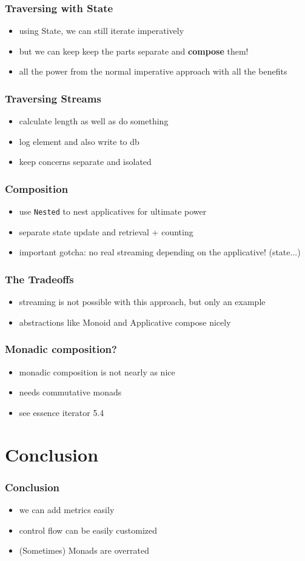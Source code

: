 \documentclass{beamer}
\begin{document}
\begin{frame}
  \frametitle{Traversing with State}
  \begin{itemize}
  \item using State, we can still iterate imperatively
  \item but we can keep keep the parts separate and \textbf{compose} them!
  \item all the power from the normal imperative approach with all the benefits
  \end{itemize}
\end{frame}

\begin{frame}
  \frametitle{Traversing Streams}
  \begin{itemize}
  \item calculate length as well as do something
  \item log element and also write to db
  \item keep concerns separate and isolated
  \end{itemize}
\end{frame}

\begin{frame}
  \frametitle{Composition}
  \begin{itemize}
  \item use \texttt{Nested} to nest applicatives for ultimate power
  \item separate state update and retrieval + counting
  \item important gotcha: no real streaming depending on the applicative! (state...)
  \end{itemize}
\end{frame}

\begin{frame}
  \frametitle{The Tradeoffs}
  \begin{itemize}
  \item streaming is not possible with this approach, but only an example
  \item abstractions like Monoid and Applicative compose nicely
  \end{itemize}
\end{frame}

\begin{frame}
  \frametitle{Monadic composition?}
  \begin{itemize}
  \item monadic composition is not nearly as nice
  \item needs commutative monads
  \item see essence iterator 5.4
  \end{itemize}
\end{frame}

\section{Conclusion}\label{sec:conclusion}

\begin{frame}
  \frametitle{Conclusion}
  \begin{itemize}
  \item we can add metrics easily
  \item control flow can be easily customized
  \item (Sometimes) Monads are overrated
  \end{itemize}
\end{frame}

\appendix{}
\end{document}
